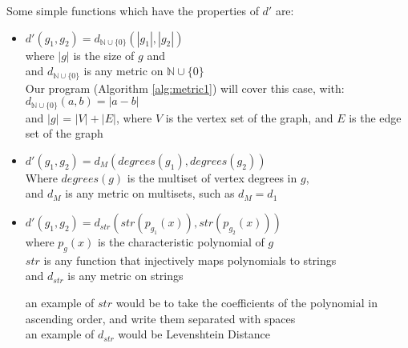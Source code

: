 	Some simple functions which have the properties of $d'$ are:
	\begin{itemize}
		\item $d'(g_1 , g_2)=d_{\mathbb{N} \cup \{0\}} (|g_1|,|g_2|)$ \\
		where $|g|$ is the size of $g$ and \\
		and $d_{\mathbb{N} \cup \{0\}}$ is any metric on $\mathbb{N} \cup \{0\}$ \\
		
		Our program (Algorithm \ref{alg:metric1}) will cover this case, with:\\
		$d_{\mathbb{N} \cup \{0\}}(a, b) = |a - b|$ \\
		and $|g|$ = $|V| + |E|$, where $V$ is the vertex set of the graph, and $E$ is the edge set of the graph
		
		\item $d'(g_1, g_2)=d_M (degrees(g_1), degrees(g_2))$ \\
		Where $degrees(g)$ is the multiset of vertex degrees in $g$, \\
		and $d_M$ is any metric on multisets, such as $d_M = d_1$
		
		\item $d'(g_1 , g_2)=d_{str} (str ( p_{g_1} (x)), str ( p_{g_2} (x)))$ \\
		where $p_g(x)$ is the characteristic polynomial of $g$ \\
		$str$ is any function that injectively maps polynomials to strings \\
		and $d_{str}$ is any metric on strings
		
		an example of $str$ would be to take the coefficients of the polynomial in ascending order, and write them separated with spaces \\
		an example of $d_{str}$ would be Levenshtein Distance
	\end{itemize}
	
